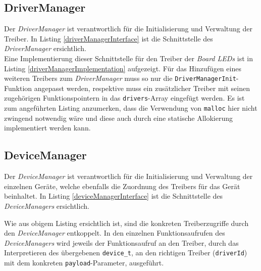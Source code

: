 \subsection{DriverManager}
\label{secDriverManager}
Der \textit{DriverManager} ist verantwortlich für die Initialisierung und Verwaltung der Treiber. In Listing \ref{driverManagerInterface} ist die Schnittstelle des \textit{DriverManager} ersichtlich.\\



Eine Implementierung dieser Schnittstelle für den Treiber der \textit{Board LEDs} ist in Listing \ref{driverManagerImplementation} aufgezeigt. Für das Hinzufügen eines weiteren Treibers zum \textit{DriverManager} muss so nur die \texttt{DriverManagerInit}-Funktion angepasst werden, respektive muss ein zusätzlicher Treiber mit seinen zugehörigen Funktionspointern in das \texttt{drivers}-Array eingefügt werden. Es ist zum angeführten Listing anzumerken, dass die Verwendung von \texttt{malloc} hier nicht zwingend notwendig wäre und diese auch durch eine statische Allokierung implementiert werden kann.\\



\subsection{DeviceManager}
\label{secDeviceManager}
Der \textit{DeviceManager} ist verantwortlich für die Initialisierung und Verwaltung der einzelnen Geräte, welche ebenfalls die Zuordnung des Treibers für das Gerät beinhaltet. In Listing \ref{deviceManagerInterface} ist die Schnittstelle des \textit{DeviceManagers} ersichtlich.



Wie aus obigem Listing ersichtlich ist, sind die konkreten Treiberzugriffe durch den \textit{DeviceManager} entkoppelt. In den einzelnen Funktionsaufrufen des \textit{DeviceManagers} wird jeweils der Funktionsaufruf an den Treiber, durch das Interpretieren des übergebenen \texttt{device\_t}, an den richtigen Treiber (\texttt{driverId}) mit dem konkreten \texttt{payload}-Parameter, ausgeführt.\\

\pagebreak 
